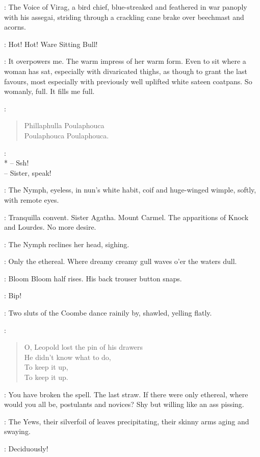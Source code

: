 :
The Voice of Virag,
%
a bird chief, blue-streaked and feathered in war panoply with his assegai,
striding through a crackling cane brake over beechmast and acorns.

\VoiceVirag:
Hot! Hot!
Ware Sitting Bull!

\Bloom:
It overpowers me.
The warm impress of her warm form.
Even to sit where a woman has sat, especially with divaricated thighs,
as though to grant the last favours,
most especially with previously well uplifted white sateen coatpans.
So womanly, full.
It fills me full.

\Waterfall[2]:
\begin{verse}
    Phillaphulla Poulaphouca\\
%
    Poulaphouca Poulaphouca.
\end{verse}

\Yews[2]:\\*
-- Ssh!\\
-- Sister, speak!

:
The Nymph, eyeless, in nun's white habit, coif and huge-winged wimple,
softly, with remote eyes.

\Nymph:
Tranquilla convent.
Sister Agatha.
Mount Carmel.
The apparitions of Knock and Lourdes.
No more desire.

:
The Nymph reclines her head, sighing.

\Nymph:
Only the ethereal.
Where dreamy creamy gull waves o'er the waters dull.

:
Bloom Bloom half rises.
His back trouser button snaps.

\Button:
Bip!

:
Two sluts of the Coombe dance rainily by, shawled, yelling flatly.

\Sluts:
\begin{verse}
    O, Leopold lost the pin of his drawers\\
    He didn't know what to do,\\
    To keep it up,\\
    To keep it up.
\end{verse}

\Bloom:
You have broken the spell.
The last straw.
If there were only ethereal, where would you all be, postulants and novices?
Shy but willing like an ass pissing.

:
The Yews, their silverfoil of leaves precipitating,
their skinny arms aging and swaying.

\Yews:
Deciduously!

